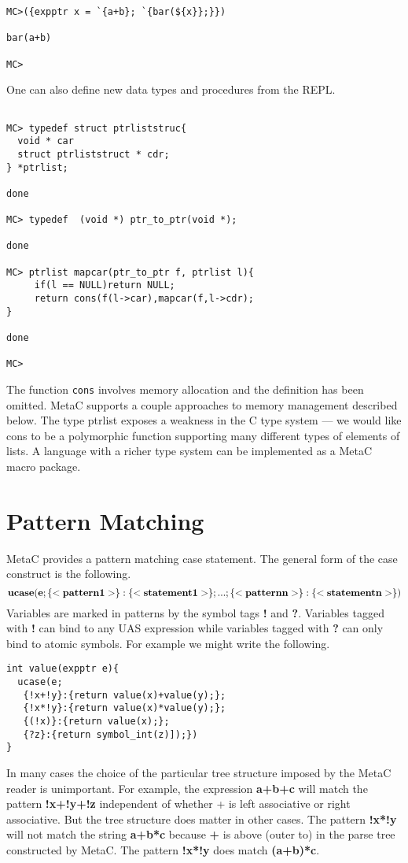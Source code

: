 \documentclass{article}
\begin{document}
\begin{verbatim}
MC>({expptr x = `{a+b}; `{bar(${x}};}})

bar(a+b)

MC>
\end{verbatim}

One can also define new data types and procedures from the REPL.

\begin{verbatim}

MC> typedef struct ptrliststruc{
  void * car
  struct ptrliststruct * cdr;
} *ptrlist;

done

MC> typedef  (void *) ptr_to_ptr(void *);

done

MC> ptrlist mapcar(ptr_to_ptr f, ptrlist l){
     if(l == NULL)return NULL;
     return cons(f(l->car),mapcar(f,l->cdr);
}

done

MC>
\end{verbatim}

The function {\tt cons} involves memory allocation and the definition has been omitted.  MetaC supports a couple approaches to memory management described below.
The type ptrlist exposes a weakness in the C type system --- we would like cons to be a polymorphic function supporting many different types of elements
of lists. A language with a richer type system can be implemented as a MetaC macro package.

\section{Pattern Matching}

MetaC provides a pattern matching case statement.
The general form of the case construct is the following.
$${\bf ucase(e; \{<pattern1>\}:\{<statement1>\}; ... ;\{<patternn>\}:\{<statementn>\})}$$
Variables are marked in patterns by the symbol tags {\bf !} and {\bf ?}.  Variables tagged with {\bf !} can bind to any UAS expression
while variables tagged with {\bf ?} can only bind to atomic symbols.
For example we might write the following.

\begin{verbatim}
int value(expptr e){
  ucase(e;
   {!x+!y}:{return value(x)+value(y);};
   {!x*!y}:{return value(x)*value(y);};
   {(!x)}:{return value(x);};
   {?z}:{return symbol_int(z)]);})
}
\end{verbatim}

In many cases the choice of the particular tree structure imposed by the MetaC reader is unimportant.  For example, the expression {\bf a+b+c} will match the pattern
{\bf !x+!y+!z} independent of whether + is left associative or right associative.  But the tree structure does matter in other cases.  The pattern {\bf !x*!y}
will not match the string {\bf a+b*c} because {\bf +} is above (outer to) {\bf *} in the parse tree constructed by MetaC. The pattern {\bf !x*!y} does match {\bf (a+b)*c}.
\end{document}
